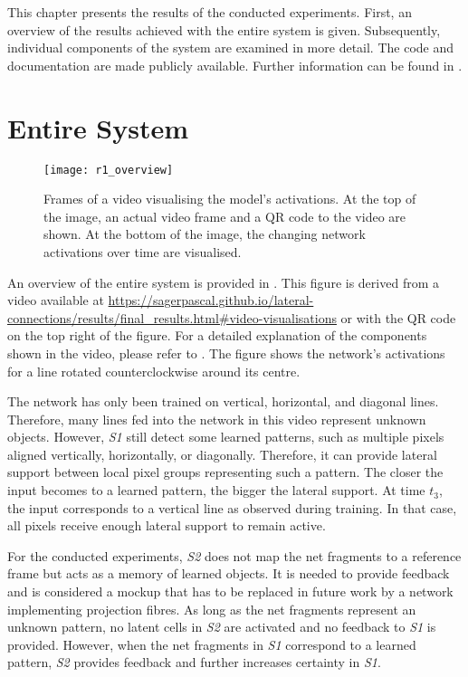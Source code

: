 This chapter presents the results of the conducted experiments. First, an overview of the results achieved with the entire system is given. Subsequently, individual components of the system are examined in more detail.
The code and documentation are made publicly available. Further information can be found in .

\section{Entire System}
%
\begin{figure}[h]
    \centering
    \texttt{[image: r1\_overview]}
    \caption[Frames of a video visualising the model's activations]{Frames of a video visualising the model's activations. At the top of the image, an actual video frame and a QR code to the video are shown. At the bottom of the image, the changing network activations over time are visualised.}
\end{figure}
%
An overview of the entire system is provided in .
This figure is derived from a video available at \url{https://sagerpascal.github.io/lateral-connections/results/final_results.html#video-visualisations} or with the QR code on the top right of the figure.
For a detailed explanation of the components shown in the video, please refer to .
The figure shows the network's activations for a line rotated counterclockwise around its centre.

The network has only been trained on vertical, horizontal, and diagonal lines.
Therefore, many lines fed into the network in this video represent unknown objects.
However, \emph{S1} still detect some learned patterns, such as multiple pixels aligned vertically, horizontally, or diagonally.
Therefore, it can provide lateral support between local pixel groups representing such a pattern.
The closer the input becomes to a learned pattern, the bigger the lateral support.
At time $t_3$, the input corresponds to a vertical line as observed during training.
In that case, all pixels receive enough lateral support to remain active.

For the conducted experiments, \emph{S2} does not map the net fragments to a reference frame but acts as a memory of learned objects.
It is needed to provide feedback and is considered a mockup that has to be replaced in future work by a network implementing projection fibres.
As long as the net fragments represent an unknown pattern, no latent cells in \emph{S2} are activated and no feedback to \emph{S1} is provided.
However, when the net fragments in \emph{S1} correspond to a learned pattern, \emph{S2} provides feedback and further increases certainty in \emph{S1}.

